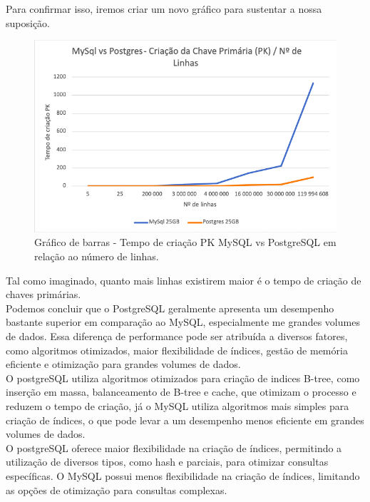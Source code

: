 \documentclass{article}
\begin{document}
Para confirmar isso, iremos criar um novo gráfico para sustentar a nossa suposição.

\begin{figure}[H]
  \centering
  \includegraphics[width=\textwidth]{Graphs/linesvspk.png}
  \caption{Gráfico de barras - Tempo de criação PK MySQL vs PostgreSQL em relação ao número de linhas.}
  \label{fig:PKCreation2}
\end{figure}

\quad Tal como imaginado, quanto mais linhas existirem maior é o tempo de criação de chaves primárias. \\
\quad Podemos concluir que o PostgreSQL geralmente apresenta um desempenho bastante superior em comparação ao MySQL, especialmente me grandes volumes de dados. Essa diferença de performance pode ser atribuída a diversos fatores, como algoritmos otimizados, maior flexibilidade de índices, gestão de memória eficiente e otimização para grandes volumes de dados.\\

\quad O postgreSQL utiliza algoritmos otimizados para criação de indices B-tree, como inserção em massa, balanceamento de B-tree e cache, que otimizam o processo e reduzem o tempo de criação, já o MySQL utiliza algoritmos mais simples para criação de índices, o que pode levar a um desempenho menos eficiente em grandes volumes de dados.\\

\quad O postgreSQL oferece maior flexibilidade na criação de índices, permitindo a utilização de diversos tipos, como hash e parciais, para otimizar consultas específicas. O MySQL possui menos flexibilidade na criação de índices, limitando as opções de otimização para consultas complexas.\\
\end{document}
